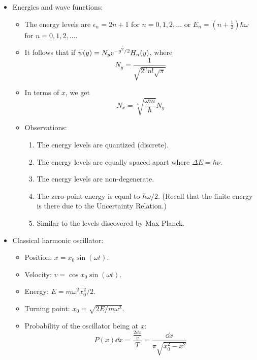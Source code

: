 \documentclass[../notes.tex]{subfiles}
\begin{document}
\begin{itemize}
\begin{itemize}
    \end{itemize}
    \item Energies and wave functions:
    \begin{itemize}
        \item The energy levels are $\epsilon_n=2n+1$ for $n=0,1,2,\dots$ or $E_n=(n+\frac{1}{2})\hbar\omega$ for $n=0,1,2,\dots$.
        \item It follows that if $\psi(y)=N_y\e[-y^2/2]H_n(y)$, where
        \begin{equation*}
            N_y = \frac{1}{\sqrt{2^nn!\sqrt{\pi}}}
        \end{equation*}
        \item In terms of $x$, we get
        \begin{equation*}
            N_x = \sqrt[4]{\frac{\omega m}{\hbar}}N_y
        \end{equation*}
        \item Observations:
        \begin{enumerate}
            \item The energy levels are quantized (discrete).
            \item The energy levels are equally spaced apart where $\Delta E=\hbar\nu$.
            \item The energy levels are non-degenerate.
            \item The zero-point energy is equal to $\hbar\omega/2$. (Recall that the finite energy is there due to the Uncertainty Relation.)
            \item Similar to the levels discovered by Max Planck.
        \end{enumerate}
    \end{itemize}
    \item Classical harmonic oscillator:
    \begin{itemize}
        \item Position: $x=x_0\sin(\omega t)$.
        \item Velocity: $v=\cos x_0\sin(\omega t)$.
        \item Energy: $E=m\omega^2x_0^2/2$.
        \item Turning point: $x_0=\sqrt{2E/m\omega^2}$.
        \item Probability of the oscillator being at $x$:
        \begin{equation*}
            P(x)\dd{x} = \frac{\frac{2\dd{x}}{v}}{T} = \frac{\dd{x}}{\pi\sqrt{x_0^2-x^2}}
        \end{equation*}

\end{itemize}
\end{itemize}
\end{document}
